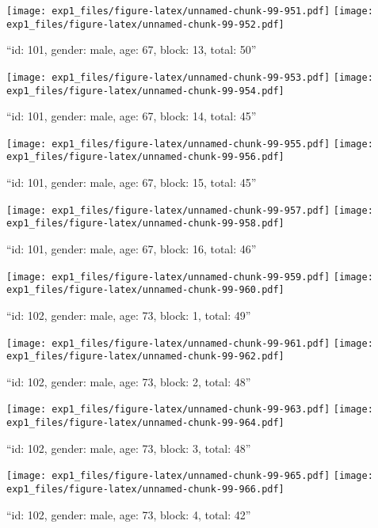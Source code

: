 \documentclass[,]{article}
\begin{document}
\texttt{[image: exp1\_files/figure-latex/unnamed-chunk-99-951.pdf]}
\texttt{[image: exp1\_files/figure-latex/unnamed-chunk-99-952.pdf]}

\newpage
[1] 

``id: 101, gender: male, age: 67, block: 13, total: 50''

\texttt{[image: exp1\_files/figure-latex/unnamed-chunk-99-953.pdf]}
\texttt{[image: exp1\_files/figure-latex/unnamed-chunk-99-954.pdf]}

\newpage
[1] 

``id: 101, gender: male, age: 67, block: 14, total: 45''

\texttt{[image: exp1\_files/figure-latex/unnamed-chunk-99-955.pdf]}
\texttt{[image: exp1\_files/figure-latex/unnamed-chunk-99-956.pdf]}

\newpage
[1] 

``id: 101, gender: male, age: 67, block: 15, total: 45''

\texttt{[image: exp1\_files/figure-latex/unnamed-chunk-99-957.pdf]}
\texttt{[image: exp1\_files/figure-latex/unnamed-chunk-99-958.pdf]}

\newpage
[1] 

``id: 101, gender: male, age: 67, block: 16, total: 46''

\texttt{[image: exp1\_files/figure-latex/unnamed-chunk-99-959.pdf]}
\texttt{[image: exp1\_files/figure-latex/unnamed-chunk-99-960.pdf]}

\newpage
[1] 

``id: 102, gender: male, age: 73, block: 1, total: 49''

\texttt{[image: exp1\_files/figure-latex/unnamed-chunk-99-961.pdf]}
\texttt{[image: exp1\_files/figure-latex/unnamed-chunk-99-962.pdf]}

\newpage
[1] 

``id: 102, gender: male, age: 73, block: 2, total: 48''

\texttt{[image: exp1\_files/figure-latex/unnamed-chunk-99-963.pdf]}
\texttt{[image: exp1\_files/figure-latex/unnamed-chunk-99-964.pdf]}

\newpage
[1] 

``id: 102, gender: male, age: 73, block: 3, total: 48''

\texttt{[image: exp1\_files/figure-latex/unnamed-chunk-99-965.pdf]}
\texttt{[image: exp1\_files/figure-latex/unnamed-chunk-99-966.pdf]}

\newpage
[1] 

``id: 102, gender: male, age: 73, block: 4, total: 42''
\end{document}
